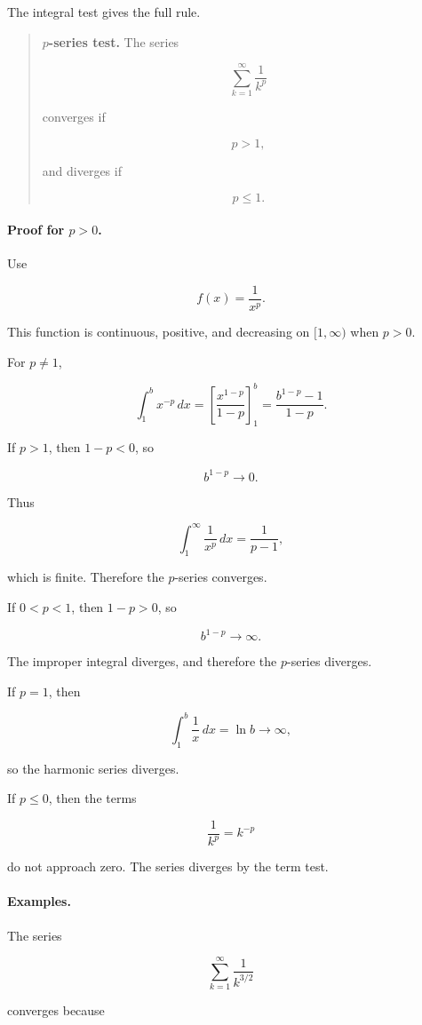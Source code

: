 The integral test gives the full rule.

\begin{quote}
\textbf{\(p\)-series test.}
The series

\[
\sum_{k=1}^{\infty}\frac1{k^p}
\]

converges if

\[
p>1,
\]

and diverges if

\[
p\le1.
\]
\end{quote}

\paragraph{Proof for \(p>0\).}
Use

\[
f(x)=\frac1{x^p}.
\]

This function is continuous, positive, and decreasing on \([1,\infty)\) when \(p>0\).

For \(p\neq1\),

\[
\int_1^b x^{-p}\,dx
=
\left[\frac{x^{1-p}}{1-p}\right]_1^b
=
\frac{b^{1-p}-1}{1-p}.
\]

If \(p>1\), then \(1-p<0\), so

\[
b^{1-p}\to0.
\]

Thus

\[
\int_1^{\infty}\frac1{x^p}\,dx
=
\frac1{p-1},
\]

which is finite.  Therefore the \(p\)-series converges.

If \(0<p<1\), then \(1-p>0\), so

\[
b^{1-p}\to\infty.
\]

The improper integral diverges, and therefore the \(p\)-series diverges.

If \(p=1\), then

\[
\int_1^b \frac1x\,dx=\ln b\to\infty,
\]

so the harmonic series diverges.

If \(p\le0\), then the terms

\[
\frac1{k^p}=k^{-p}
\]

do not approach zero.  The series diverges by the term test.

\paragraph{Examples.}
The series

\[
\sum_{k=1}^{\infty}\frac1{k^{3/2}}
\]

converges because

